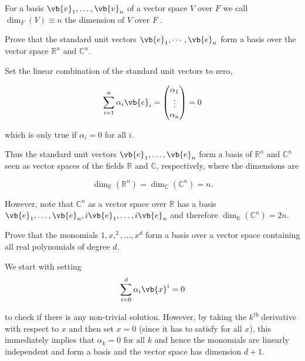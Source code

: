 \documentclass[a4paper,12pt]{report}
\begin{document}
\begin{definition} \label{dimension} 
For a basis \(\vb{v}_{1}, \ldots, \vb{v}_n \) of a vector space \(V\) over \(F\) we call \(\dim _{F} (V) \equiv n \) the dimension of \(V\) over \(F\) . 
\end{definition}

{Prove that the standard unit vectors \(\vb{e}_1, \cdots, \vb{e}_n \) form a basis over the vector space \(\mathbb{R}^{n} \text { and } \mathbb{C}^{n} \). }
{Set the linear combination of the standard unit vectors to zero, 

\begin{equation}
    \sum_{i=1}^{n} \alpha _{i} \vb{e} _{i} = \begin{pmatrix}
         \alpha _{1}  \\
         \vdots  \\
         \alpha _{n}  \\
    \end{pmatrix} =0
\end{equation}

which is only true if \(\alpha _{i} = 0 \text{ for all } i\).

Thus the standard unit vectors \(\vb{e}_{1}, \ldots, \vb{e}_n \) form a basis of \(\mathbb{R}^{n} \text { and } \mathbb{C}^{n}  \) seen as vector spaces of the fields \(\mathbb{R}\text { and } \mathbb{C}\), respectively, where the dimensions are 

\begin{equation}
    \dim _{\mathbb{R}} (\mathbb{R}^{n} ) = \dim _{\mathbb{C}} (\mathbb{C}^{n} ) = n. 
\end{equation}

However, note that \(\mathbb{C}^{n} \) as a vector space over \(\mathbb{R}\) has a basis \(\vb{e}_{1}, \ldots, \vb{e}_n, i \vb{e} _{1}, \ldots , i \vb{e} _{n}   \) and therefore \(\dim _{\mathbb{R}} (\mathbb{C}^{n} ) = 2n\). 
} 

{Prove that the monomials \(1,x,^2,\ldots ,x^{d} \) form a basis over a vector space containing all real polynomials of degree \(d\).}
{We start with setting  
\begin{equation}
    \sum_{i=0}^{d} \alpha _{i} \vb{x} ^{i} =0 
\end{equation}

to check if there is any non-trivial solution. However, by taking the \(k^{\text{th }} \)derivative with respect to \(x\) and then set \(x=0\) (since it has to satisfy for all \(x\)), this immediately implies that \(\alpha _{k} = 0 \text{ for all }  k\) and hence the monomials are linearly independent and form a basis and the vector space has dimension \(d+1\).
}
\end{document}
